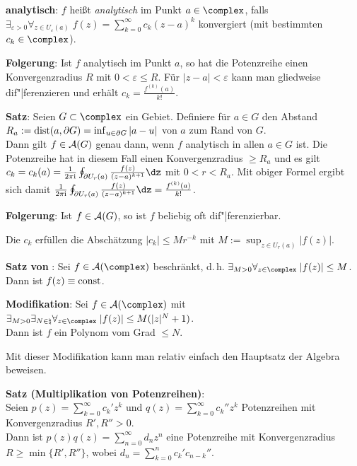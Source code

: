 \linie

\textbf{analytisch}:
$f$ heißt \emph{analytisch} im Punkt $a \in \complex$, falls\\
$\exists_{\varepsilon > 0} \forall_{z \in U_\varepsilon(a)}\;
f(z) = \sum_{k=0}^\infty c_k (z - a)^k$ konvergiert
(mit bestimmten $c_k \in \complex$).

\textbf{Folgerung}:
Ist $f$ analytisch im Punkt $a$, so hat die Potenzreihe einen Konvergenzradius
$R$ mit $0 < \varepsilon \le R$.
Für $|z - a| < \varepsilon$ kann man gliedweise dif"|ferenzieren und erhält
$c_k = \frac{f^{(k)}(a)}{k!}$.

\textbf{Satz}:
Seien $G \subset \complex$ ein Gebiet.
Definiere für $a \in G$ den Abstand\\
$R_a := \operatorname{dist}(a, \partial G)
= \inf_{u \in \partial G} |a - u|$ von $a$ zum Rand von $G$.\\
Dann gilt $f \in \mathcal{A}(G)$ genau dann, wenn $f$ analytisch in allen $a \in G$ ist.
Die Potenzreihe hat in diesem Fall einen Konvergenzradius $\ge R_a$
und es gilt $c_k = c_k(a) = \frac{1}{2\pi\i}
\oint_{\partial U_r(a)} \frac{f(z)}{(z - a)^{k+1}} \dz$ mit $0 < r < R_a$.
Mit obiger Formel ergibt sich damit
$\frac{1}{2\pi\i} \oint_{\partial U_r(a)} \frac{f(z)}{(z - a)^{k+1}} \dz =
\frac{f^{(k)}(a)}{k!}$.

\textbf{Folgerung}:
Ist $f \in \mathcal{A}(G)$, so ist $f$ beliebig oft dif"|ferenzierbar.

Die $c_k$ erfüllen die Abschätzung $|c_k| \le M r^{-k}$ mit
$M := \sup_{z \in U_r(a)} |f(z)|$.

\linie

\textbf{Satz von }:
Sei $f \in \A(\complex)$ beschränkt, d.\,h.
$\exists_{M > 0} \forall_{z \in \complex}\; |f(z)| \le M$.\\
Dann ist $f(z) \equiv \operatorname{const}$.

\textbf{Modifikation}:
Sei $f \in \A(\complex)$ mit
$\exists_{M > 0} \exists_{N \in \natural} \forall_{z \in \complex}\;
|f(z)| \le M (|z|^N + 1)$.\\
Dann ist $f$ ein Polynom vom Grad $\le N$.

Mit dieser Modifikation kann man relativ einfach den Hauptsatz der Algebra
beweisen.

\textbf{Satz (Multiplikation von Potenzreihen)}:\\
Seien $p(z) = \sum_{k=0}^\infty c_k' z^k$ und
$q(z) = \sum_{k=0}^\infty c_k'' z^k$ Potenzreihen
mit Konvergenzradius $R', R'' > 0$.\\
Dann ist $p(z) q(z) = \sum_{n=0}^\infty d_n z^n$ eine Potenzreihe
mit Konvergenzradius
$R \ge \min\{R', R''\}$, wobei
$d_n = \sum_{k=0}^n c_k' c_{n-k}''$.


